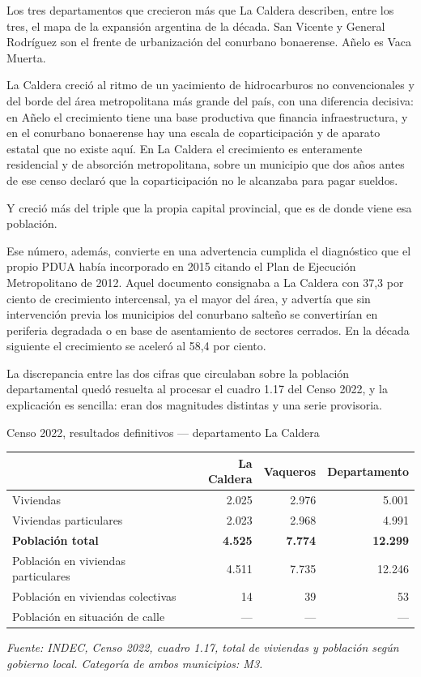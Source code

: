 \begin{cautela}
Los tres departamentos que crecieron más que La Caldera describen, entre los tres, el mapa de la expansión argentina de la década. San Vicente y General Rodríguez son el frente de urbanización del conurbano bonaerense. Añelo es Vaca Muerta.

La Caldera creció al ritmo de un yacimiento de hidrocarburos no convencionales y del borde del área metropolitana más grande del país, con una diferencia decisiva: en Añelo el crecimiento tiene una base productiva que financia infraestructura, y en el conurbano bonaerense hay una escala de coparticipación y de aparato estatal que no existe aquí. En La Caldera el crecimiento es enteramente residencial y de absorción metropolitana, sobre un municipio que dos años antes de ese censo declaró que la coparticipación no le alcanzaba para pagar sueldos.

Y creció más del triple que la propia capital provincial, que es de donde viene esa población.

Ese número, además, convierte en una advertencia cumplida el diagnóstico que el propio PDUA había incorporado en 2015 citando el Plan de Ejecución Metropolitano de 2012. Aquel documento consignaba a La Caldera con 37,3 por ciento de crecimiento intercensal, ya el mayor del área, y advertía que sin intervención previa los municipios del conurbano salteño se convertirían en periferia degradada o en base de asentamiento de sectores cerrados. En la década siguiente el crecimiento se aceleró al 58,4 por ciento.
\end{cautela}

La discrepancia entre las dos cifras que circulaban sobre la población departamental quedó resuelta al procesar el cuadro 1.17 del Censo 2022, y la explicación es sencilla: eran dos magnitudes distintas y una serie provisoria.

\begin{ficha}{Censo 2022, resultados definitivos --- departamento La Caldera}
\begin{center}\small
\begin{tabular}{@{}lrrr@{}}
\toprule
& \textbf{La Caldera} & \textbf{Vaqueros} & \textbf{Departamento} \\
\midrule
Viviendas & 2.025 & 2.976 & 5.001 \\
Viviendas particulares & 2.023 & 2.968 & 4.991 \\
\textbf{Población total} & \textbf{4.525} & \textbf{7.774} & \textbf{12.299} \\
Población en viviendas particulares & 4.511 & 7.735 & 12.246 \\
Población en viviendas colectivas & 14 & 39 & 53 \\
Población en situación de calle & --- & --- & --- \\
\bottomrule
\end{tabular}
\end{center}
\textit{Fuente: INDEC, Censo 2022, cuadro 1.17, total de viviendas y población según gobierno local. Categoría de ambos municipios: M3.}
\end{ficha}

